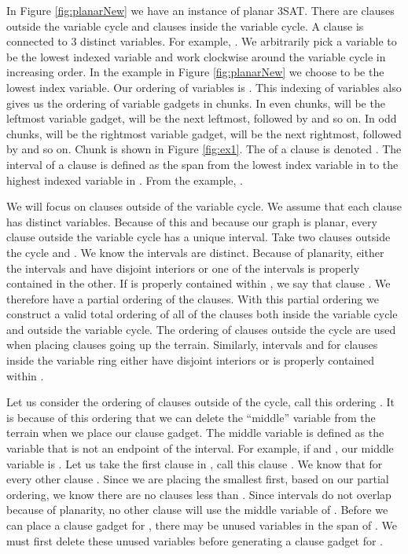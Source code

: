 \documentclass[11pt]{article}
\begin{document}
In Figure \ref{fig:planarNew} we have an instance of planar 3SAT.  There are clauses outside the variable cycle and clauses inside the variable cycle.  A clause  is connected to 3 distinct variables.  For example, .  We arbitrarily pick a variable to be the lowest indexed variable and work clockwise around the variable cycle in increasing order.  In the example in Figure \ref{fig:planarNew} we choose  to be the lowest index variable.  Our ordering of variables is .  This indexing of variables also gives us the ordering of variable gadgets in chunks.  In even chunks,  will be the leftmost variable gadget,  will be the next leftmost, followed by  and so on.  In odd chunks,  will be the rightmost variable gadget,  will be the next rightmost, followed by  and so on.  Chunk  is shown in Figure \ref{fig:ex1}.  The  of a clause  is denoted .  The interval of a clause is defined as the span from the lowest index variable in  to the highest indexed variable in .  From the example, .  

We will focus on clauses outside of the variable cycle.  We assume that each clause has  distinct variables.  Because of this and because our graph is planar, every clause outside the variable cycle has a unique interval.  Take two clauses outside the cycle  and .  We know the intervals are distinct.  Because of planarity, either the intervals  and  have disjoint interiors or one of the intervals is properly contained in the other.  If  is properly contained within , we say that clause .  We therefore have a partial ordering of the clauses.  With this partial ordering we construct a valid total ordering of all of the clauses both inside the variable cycle and outside the variable cycle.  The ordering of clauses outside the cycle are used when placing clauses going up the terrain.  Similarly, intervals  and  for clauses inside the variable ring either have disjoint interiors or  is properly contained within .

Let us consider the ordering of clauses outside of the cycle, call this ordering .  It is because of this ordering that we can delete the ``middle'' variable from the terrain when we place our clause gadget.  The middle variable is defined as the variable that is not an endpoint of the interval.  For example, if  and , our middle variable is .  Let us take the first clause in , call this clause .  We know that for every other clause .  Since we are placing the smallest  first, based on our partial ordering, we know there are no clauses less than .  Since intervals do not overlap because of planarity, no other clause  will use the middle variable of .  Before we can place a clause gadget for , there may be unused variables in the span of .  We must first delete these unused variables before generating a clause gadget for .
\end{document}
